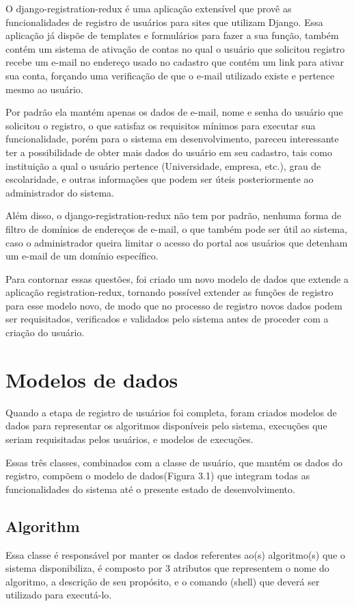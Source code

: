 \documentclass[tg]{mdtufsm}
\begin{document}
O django-registration-redux é uma aplicação extensível que provê as funcionalidades de registro de usuários para sites que utilizam Django. Essa aplicação já dispõe de templates e formulários para fazer a sua função, também contém um sistema de ativação de contas no qual o usuário que solicitou registro recebe um e-mail no endereço usado no cadastro que contém um link para ativar sua conta, forçando uma verificação de que o e-mail utilizado existe e pertence mesmo ao usuário.

 Por padrão ela mantém apenas os dados de e-mail, nome e senha do usuário que solicitou o registro, o que satisfaz os requisitos mínimos para executar sua funcionalidade, porém para o sistema em desenvolvimento, pareceu interessante ter a possibilidade de obter mais dados do usuário em seu cadastro, tais como instituição a qual o usuário pertence (Universidade, empresa, etc.), grau de escolaridade, e outras informações que podem ser úteis posteriormente ao administrador do sistema.

Além disso, o django-registration-redux não tem por padrão, nenhuma forma de filtro de domínios de endereços de e-mail, o que também pode ser útil ao sistema, caso o administrador queira limitar o acesso do portal aos usuários que detenham um e-mail de um domínio específico.

Para contornar essas questões, foi criado um novo modelo de dados que extende a aplicação registration-redux, tornando possível extender as funções de registro para esse modelo novo, de modo que no processo de registro novos dados podem ser requisitados, verificados e validados pelo sistema antes de proceder com a criação do usuário.



\section{Modelos de dados}
Quando a etapa de registro de usuários foi completa, foram criados modelos de dados para representar os algoritmos disponíveis pelo sistema, execuções que seriam requisitadas pelos usuários, e modelos de execuções.

Essas três classes, combinados com a classe de usuário, que mantém os dados do registro, compõem o modelo de dados(Figura 3.1) que integram todas as funcionalidades do sistema até o presente estado de desenvolvimento.

\subsection{Algorithm}
Essa classe é responsável por manter os dados referentes ao(s) algoritmo(s) que o sistema disponibiliza, é composto por 3 atributos que representem o nome do algoritmo, a descrição de seu propósito, e o comando (shell) que deverá ser utilizado para executá-lo.
\end{document}
